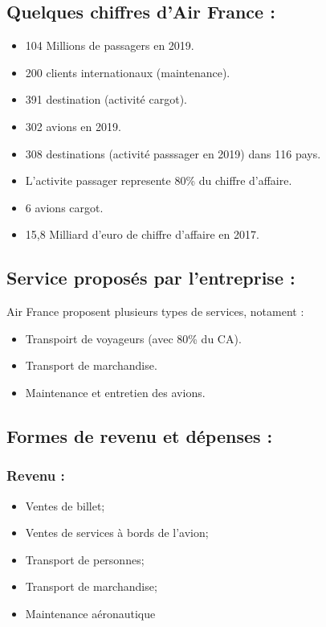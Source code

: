 \documentclass[oneside,13pt,a4paper]{article}
\begin{document}
\subsection{Quelques chiffres d'Air France : }
\begin{itemize}
  \item 104 Millions de passagers en 2019.
  \item 200 clients internationaux (maintenance).
  \item 391 destination (activité cargot).
  \item 302 avions en 2019.
  \item 308 destinations (activité passsager en 2019) dans 116 pays.
  \item L'activite passager represente 80\% du chiffre d'affaire.
  \item 6 avions cargot.
  \item 15,8 Milliard d'euro de chiffre d'affaire en 2017.
\end{itemize}

\subsection{Service proposés par l'entreprise : }
Air France proposent plusieurs types de services, notament :
\begin{itemize}
  \item Transpoirt de voyageurs (avec 80\% du CA).
  \item Transport de marchandise.
  \item Maintenance et entretien des avions.
\end{itemize}

\subsection{Formes de revenu et dépenses :}

\subsubsection{Revenu :}

\begin{itemize}
  \item Ventes de billet;
  \item Ventes de services à bords de l'avion;
  \item Transport de personnes;
  \item Transport de marchandise;
  \item Maintenance aéronautique
\end{itemize}
\end{document}
